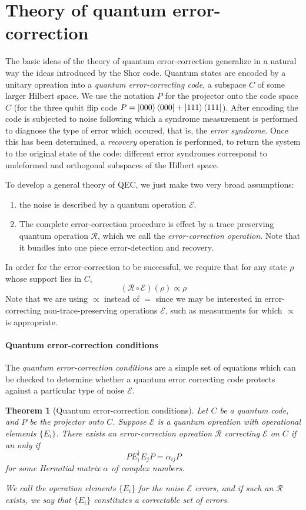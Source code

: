 \documentclass[11pt,a4paper]{article}
\theoremstyle{definition}
\theoremstyle{plain}
\newtheorem{theorem}[definition]{Theorem}
\theoremstyle{remark}
\begin{document}
\section{Theory of quantum error-correction} 
The basic ideas of the theory of quantum error-correction generalize in a natural way the ideas introduced by the Shor code. Quantum states are encoded 
by a unitary opreation into a \emph{quantum error-correcting code}, a subspace $C$ of some larger Hilbert space. We use the notation $P$ for the projector onto 
the code space $C$ (for the three qubit flip code $P = \ket{000} \bra{000} + \ket{111} \bra{111}$). After encoding the code is subjected to noise 
following which a syndrome measurement is performed to diagnose the type of error which occured, that is, the \emph{error syndrome}. 
Once this has been determined, a \emph{recovery} operation is performed, to return the system to the original state of the code: different error syndromes 
correspond to undeformed and orthogonal subspaces of the Hilbert space. 

To develop a general theory of QEC, we just make two very broad assumptions: 
\begin{enumerate}
  \item the noise is described by a quantum operation $\mathcal{E}$. 
  \item The complete error-correction procedure is effect by a trace preserving quantum operation $\mathcal{R}$, 
  which we call the \emph{error-correction operation}. Note that it bundles into one piece error-detection and recovery.  
\end{enumerate}
In order for the error-correction to be successful, we require that for any state $\rho$ whose support lies in $C$, 
$$(\mathcal{R} \circ \mathcal{E}) (\rho) \propto \rho$$
Note that we are using $\propto$ instead of $=$ since we may be interested in error-correcting non-trace-preserving operations $\mathcal{E}$, such as measurments for which $\propto$ is appropriate. 

\paragraph{Quantum error-correction conditions} 
The \emph{quantum error-correction conditions} are a simple set of equations which can be checked to determine whether a quantum error correcting code protects against a particular type of noise $\mathcal{E}$. 

\begin{theorem}[Quantum error-correction conditions] \label{thm:quantum-error-correction-conditions}
  Let $C$ be a quantum code, and $P$ be the projector onto $C$. Suppose $\mathcal{E}$ is a quantum opreation with operational elements 
  $\{E_i\}$. There exists an error-correction opreation $\mathcal{R}$ correcting $\mathcal{E}$ on $C$ if an only if 
  $$P E_i^\dagger E_j P = \alpha_{ij} P$$
  for some Hermitial matrix $\alpha$ of complex numbers. 

  We call the operation elements $\{E_i\}$ for the noise $\mathcal{E}$ \emph{errors}, and if such an $\mathcal{R}$ exists, 
  we say that $\{E_i\}$ constitutes a \emph{correctable set of errors}.
\end{theorem}
\end{document}
